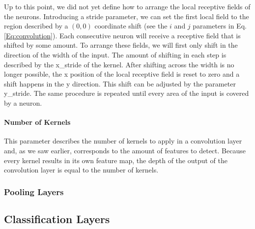 Up to this point, we did not yet define how to arrange the local receptive
fields of the neurons. Introducing a stride parameter, we can set the
first local field to the region described by a \((0, 0)\) coordinate
shift (see the \(i\) and \(j\) parameters in
Eq. \ref{Eq:convolution}). Each consecutive neuron will receive a
receptive field that is shifted by some amount. To arrange these
fields, we will first only shift in the direction of the width of the
input. The amount of shifting in each step is described by the
x\_stride of the kernel. After shifting across the width is no longer
possible, the x position of the local receptive field is reset to zero
and a shift happens in the y direction. This shift can be adjusted by
the parameter y\_stride. The same procedure is repeated until every
area of the input is covered by a neuron.

\paragraph{Number of Kernels}

This parameter describes the number of kernels to apply in a
convolution layer and, as we saw earlier, corresponds to the amount of
features to detect. Because every kernel results in its own feature
map, the depth of the output of the convolution layer is equal to the
number of kernels.

\subsubsection{Pooling Layers}

\subsection{Classification Layers}

